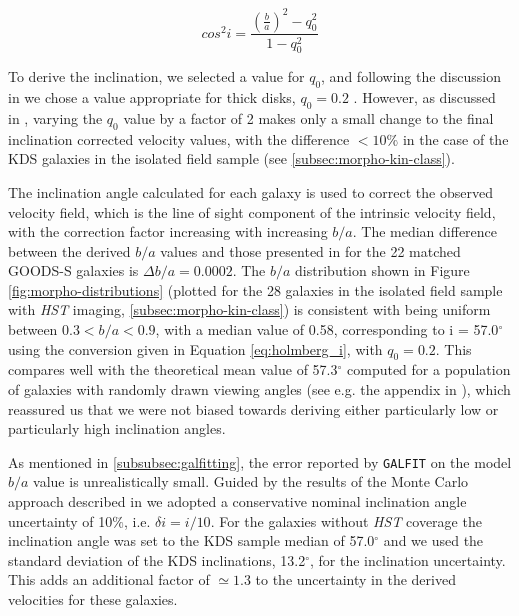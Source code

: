 \documentclass[fleqn,usenatbib]{mnras}
\begin{document}
\begin{equation}\label{eq:holmberg_i}
   cos^{2}i = \frac{\left(\frac{b}{a}\right)^{2} - q_{0}^{2}}{1 - q_{0}^{2}}
\end{equation}


To derive the inclination, we selected a value for $q_{0}$, and following the discussion in \citep{Law2012a} we chose a value appropriate for thick disks, $q_{0} = 0.2$ \citep[e.g.][]{Epinat2012,Harrison2017}.
However, as discussed in \cite{Harrison2017}, varying the $q_{0}$ value by a factor of 2 makes only a small change to the final inclination corrected velocity values, with the difference $<10\%$ in the case of the KDS galaxies in the isolated field sample (see \cref{subsec:morpho-kin-class}).

The inclination angle calculated for each galaxy is used to correct the observed velocity field, which is the line of sight component of the intrinsic velocity field, with the correction factor increasing with increasing $b/a$.
The median difference between the derived $b/a$ values and those presented in \cite{VanderWel2012} for the 22 matched GOODS-S galaxies is $\Delta b/a = 0.0002$.
The $b/a$ distribution shown in Figure \ref{fig:morpho-distributions} (plotted for the 28 galaxies in the isolated field sample with {\em HST} imaging, \cref{subsec:morpho-kin-class}) is consistent with being uniform between $0.3 < b/a < 0.9$, with a median value of 0.58, corresponding to i = 57.0$^{\circ}$ using the conversion given in Equation \ref{eq:holmberg_i}, with $q_{0}=0.2$.
This compares well with the theoretical mean value of 57.3$^{\circ}$ computed for a population of galaxies with randomly drawn viewing angles (see e.g. the appendix in \citealt{Law2009}), which reassured us that we were not biased towards deriving either particularly low or particularly high inclination angles.

As mentioned in \cref{subsubsec:galfitting}, the error reported by {\tt GALFIT} on the model $b/a$ value is unrealistically small.
Guided by the results of the Monte Carlo approach described in \cite{Epinat2012} we adopted a conservative nominal inclination angle uncertainty of 10$\%$, i.e. $\delta i = i / 10$.
For the galaxies without {\em HST} coverage the inclination angle was set to the KDS sample median of 57.0$^{\circ}$ and we used the standard deviation of the KDS inclinations, 13.2$^{\circ}$, for the inclination uncertainty.
This adds an additional factor of $\simeq1.3$ to the uncertainty in the derived velocities for these galaxies.
\end{document}
